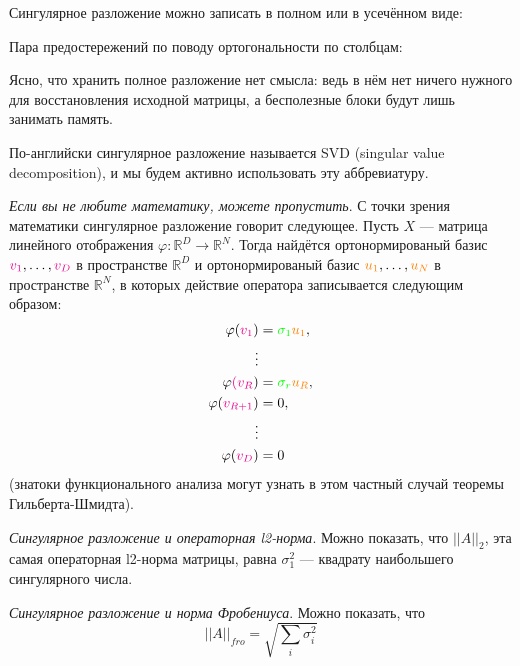 \documentclass{amsart}
\theoremstyle{definition}
\theoremstyle{remark}
\numberwithin{equation}{section}
\begin{document}
Сингулярное разложение можно записать в полном или в усечённом виде:

\begin{center}
\end{center}

Пара предостережений по поводу ортогональности по столбцам:

\begin{center}
\end{center}

Ясно, что хранить полное разложение нет смысла: ведь в нём нет ничего нужного для восстановления исходной матрицы, а бесполезные блоки будут лишь занимать память.

По-английски сингулярное разложение называется SVD (singular value decomposition), и мы будем активно использовать эту аббревиатуру.

\textit{Если вы не любите математику, можете пропустить}. С точки зрения математики сингулярное разложение говорит следующее. Пусть $X$ --- матрица линейного отображения $\varphi:\mathbb{R}^D\longrightarrow\mathbb{R}^N$. Тогда найдётся ортонормированый базис $\textcolor{magenta}{v_1},\dots,\textcolor{magenta}{v_D}$ в пространстве $\mathbb{R}^D$ и ортонормированый базис $\textcolor{orange}{u_1},\dots,\textcolor{orange}{u_N}$ в пространстве $\mathbb{R}^N$, в которых действие оператора записывается следующим образом:
\begin{align*}
\varphi(\textcolor{magenta}{v_1}) &= \textcolor{green}{\sigma_1}\textcolor{orange}{u_1},\\
\vdots\\
\varphi\textcolor{magenta}{(v_R}) &= \textcolor{green}{\sigma_r}\textcolor{orange}{u_R},\\
\varphi(\textcolor{magenta}{v_{R+1}}) &= 0,\\
\vdots\\
\varphi(\textcolor{magenta}{v_D}) &= 0
\end{align*}
(знатоки функционального анализа могут узнать в этом частный случай теоремы Гильберта-Шмидта).

\textit{Сингулярное разложение и операторная l2-норма}. Можно показать, что $||A||_2$, эта самая операторная l2-норма матрицы, равна $\sigma_1^2$ --- квадрату наибольшего сингулярного числа.

\textit{Сингулярное разложение и норма Фробениуса}. Можно показать, что 
$$||A||_{fro} = \sqrt{\sum_i\sigma_i^2}$$
\end{document}
